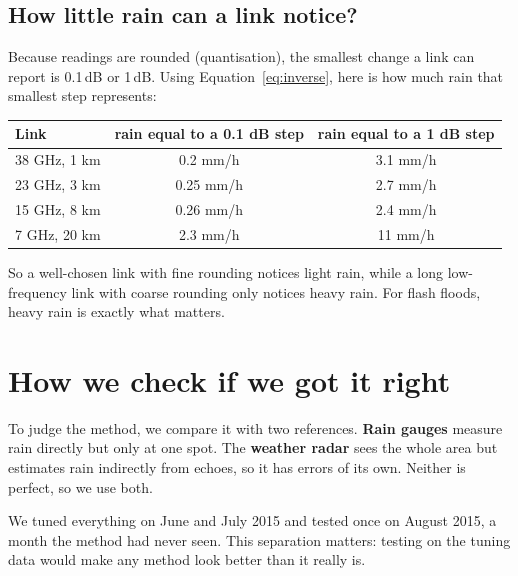 \documentclass[11pt,a4paper]{article}
\begin{document}
\subsection*{How little rain can a link notice?}
Because readings are rounded (quantisation), the smallest change a link can report is 0.1\,dB or 1\,dB. Using
Equation~\ref{eq:inverse}, here is how much rain that smallest step represents:
\begin{center}\small
\begin{tabular}{lcc}
\toprule
Link & rain equal to a 0.1 dB step & rain equal to a 1 dB step \\
\midrule
38 GHz, 1 km & 0.2 mm/h & 3.1 mm/h \\
23 GHz, 3 km & 0.25 mm/h & 2.7 mm/h \\
15 GHz, 8 km & 0.26 mm/h & 2.4 mm/h \\
7 GHz, 20 km & 2.3 mm/h & 11 mm/h \\
\bottomrule
\end{tabular}
\end{center}
So a well-chosen link with fine rounding notices light rain, while a long low-frequency link with coarse rounding
only notices heavy rain. For flash floods, heavy rain is exactly what matters.

\section{How we check if we got it right}
\label{sec:scores}

To judge the method, we compare it with two references. \textbf{Rain gauges} measure rain directly but only at one
spot. The \textbf{weather radar} sees the whole area but estimates rain indirectly from echoes, so it has errors of
its own. Neither is perfect, so we use both.

We tuned everything on June and July 2015 and tested once on August 2015, a month the method had never seen. This
separation matters: testing on the tuning data would make any method look better than it really is.
\end{document}
